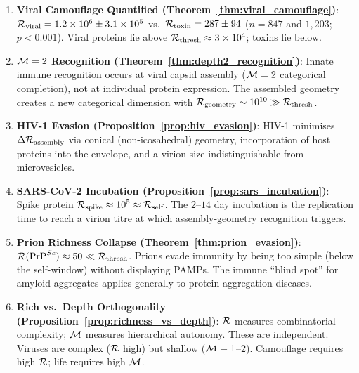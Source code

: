 \begin{chapterbox}[title=Chapter 24 --- Key Results Established]
\begin{enumerate}[label=\textbf{\arabic*.}]
  \item \textbf{Viral Camouflage Quantified (Theorem~\ref{thm:viral_camouflage})}:
        $\mathcal{R}_{\mathrm{viral}} = 1.2 \times 10^6 \pm 3.1 \times 10^5$ vs.\
        $\mathcal{R}_{\mathrm{toxin}} = 287 \pm 94$ ($n = 847$ and $1{,}203$;
        $p < 0.001$). Viral proteins lie above $\mathcal{R}_{\mathrm{thresh}} \approx 3 \times 10^4$;
        toxins lie below.

  \item \textbf{$\mathcal{M} = 2$ Recognition (Theorem~\ref{thm:depth2_recognition})}:
        Innate immune recognition occurs at viral capsid assembly
        ($\mathcal{M} = 2$ categorical completion), not at individual protein
        expression. The assembled geometry creates a new categorical dimension
        with $\mathcal{R}_{\mathrm{geometry}} \sim 10^{10} \gg \mathcal{R}_{\mathrm{thresh}}$.

  \item \textbf{HIV-1 Evasion (Proposition~\ref{prop:hiv_evasion})}:
        HIV-1 minimises $\Delta\mathcal{R}_{\mathrm{assembly}}$ via conical
        (non-icosahedral) geometry, incorporation of host proteins into the
        envelope, and a virion size indistinguishable from microvesicles.

  \item \textbf{SARS-CoV-2 Incubation (Proposition~\ref{prop:sars_incubation})}:
        Spike protein $\mathcal{R}_{\mathrm{spike}} \approx 10^5 \approx \mathcal{R}_{\mathrm{self}}$.
        The $2$--$14$ day incubation is the replication time to reach a
        virion titre at which assembly-geometry recognition triggers.

  \item \textbf{Prion Richness Collapse (Theorem~\ref{thm:prion_evasion})}:
        $\mathcal{R}(\mathrm{PrP}^{Sc}) \approx 50 \ll \mathcal{R}_{\mathrm{thresh}}$.
        Prions evade immunity by being too simple (below the self-window)
        without displaying PAMPs. The immune ``blind spot'' for amyloid
        aggregates applies generally to protein aggregation diseases.

  \item \textbf{Rich vs.\ Depth Orthogonality (Proposition~\ref{prop:richness_vs_depth})}:
        $\mathcal{R}$ measures combinatorial complexity; $\mathcal{M}$ measures hierarchical
        autonomy. These are independent. Viruses are complex ($\mathcal{R}$ high)
        but shallow ($\mathcal{M} = 1$--$2$). Camouflage requires high $\mathcal{R}$;
        life requires high $\mathcal{M}$.


\end{enumerate}
\end{chapterbox}
